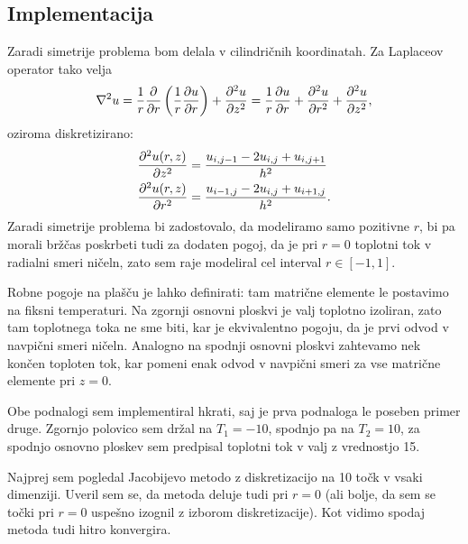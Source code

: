 \subsection{Implementacija}
Zaradi simetrije problema bom delala v cilindričnih koordinatah. Za Laplaceov operator tako velja
\[ \nabla^2 u = \frac{1}{r} \pdv{}{r} \left( \frac{1}{r} \pdv{u}{r}\right)
+\pdv[2]{u}{z} =  \frac{1}{r} \pdv{u}{r} + \pdv[2]{u}{r} + \pdv[2]{u}{z},\]
oziroma diskretizirano:
\begin{align*}
    \pdv[2]{u(r,z)}{z} &= \frac{u_{i, j-1} - 2 u_{i,j} + u_{i,j+1}}{h^2}\\
    \pdv[2]{u(r,z)}{r} &= \frac{u_{i-1,j} - 2 u_{i,j} + u_{i+1,j}}{h^2}.
\end{align*}
Zaradi simetrije problema bi zadostovalo, da modeliramo samo pozitivne $r$, bi pa morali bržčas poskrbeti tudi za dodaten pogoj, da je pri $r=0$ toplotni tok v radialni smeri ničeln, zato sem raje modeliral cel interval $r \in [-1, 1 ]$.

Robne pogoje na plašču je lahko definirati: tam matrične elemente le postavimo na fiksni temperaturi. Na zgornji osnovni ploskvi je valj toplotno izoliran, zato tam toplotnega toka ne sme biti, kar je ekvivalentno pogoju, da je prvi odvod v navpični smeri ničeln. Analogno na spodnji osnovni ploskvi zahtevamo nek končen toploten tok, kar pomeni enak odvod v navpični smeri za vse matrične elemente pri $z=0.$

Obe podnalogi sem implementiral hkrati, saj je prva podnaloga le poseben primer druge. Zgornjo polovico sem držal na $T_1=-10$, spodnjo pa na $T_2 = 10$, za spodnjo osnovno ploskev sem predpisal toplotni tok v valj z vrednostjo 15.

Najprej sem pogledal Jacobijevo metodo z diskretizacijo na 10 točk v vsaki dimenziji. Uveril sem se, da metoda deluje tudi pri $r=0$ (ali bolje, da sem se točki pri $r=0$ uspešno izognil z izborom diskretizacije). Kot vidimo spodaj metoda tudi hitro konvergira.


